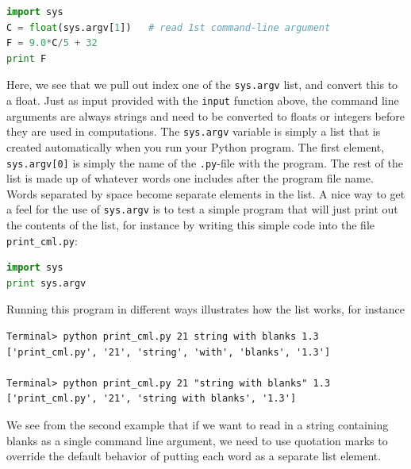 \documentclass[graybox,envcountchap,sectrefs,final]{svmonodo}
\begin{document}
\begin{lstlisting}[language=Python,style=blue1bar]
import sys
C = float(sys.argv[1])   # read 1st command-line argument
F = 9.0*C/5 + 32
print F
\end{lstlisting}
Here, we see that we pull out index one of the \texttt{sys.argv} list, and convert this to a float. Just as input provided with the
\texttt{input} function above, the command line arguments are always strings and need to be converted to floats or integers
before they are used in computations. The \texttt{sys.argv} variable is simply a list that is created automatically when you run your Python program.
The first element, \texttt{sys.argv[0]} is simply the name of the \texttt{.py}-file with the program. The rest of the list is made up of whatever words one
includes after the program file name. Words separated by space become separate elements in the list. A nice way to get a feel for the use of
\texttt{sys.argv} is to test a simple program that will just print out the contents of the list, for instance by writing this simple code into the
file \Verb!print_cml.py!:
\begin{lstlisting}[language=Python,style=blue1]
import sys
print sys.argv
\end{lstlisting}
Running this program in different ways illustrates how the list works, for instance
\begin{Verbatim}[frame=lines,label=\fbox{{\tiny Terminal}},framesep=2.5mm,framerule=0.7pt]
Terminal> python print_cml.py 21 string with blanks 1.3
['print_cml.py', '21', 'string', 'with', 'blanks', '1.3']

Terminal> python print_cml.py 21 "string with blanks" 1.3
['print_cml.py', '21', 'string with blanks', '1.3']
\end{Verbatim}
We see from the second example that if we want to read in a string containing blanks as a single command line argument, we
need to use quotation marks to override the default behavior of putting each word as a separate list element.
\end{document}
